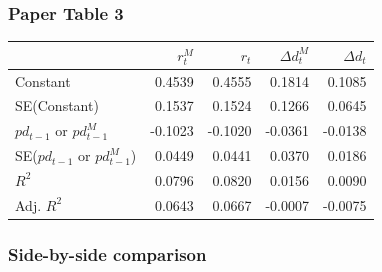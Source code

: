 \documentclass[11pt]{article}
\begin{document}
\subsubsection{Paper Table 3}\label{paper-table-3}

{\def\LTcaptype{none} %
\begin{longtable}[]{@{}lrrrr@{}}
\toprule\noalign{}
& \(r_t^M\) & \(r_t\) & \(\Delta d_t^M\) & \(\Delta d_t\) \\
\midrule\noalign{}
\endhead
\bottomrule\noalign{}
\endlastfoot
Constant & 0.4539 & 0.4555 & 0.1814 & 0.1085 \\
SE(Constant) & 0.1537 & 0.1524 & 0.1266 & 0.0645 \\
\(pd_{t-1}\) or \(pd_{t-1}^M\) & -0.1023 & -0.1020 & -0.0361 &
-0.0138 \\
SE(\(pd_{t-1}\) or \(pd_{t-1}^M\)) & 0.0449 & 0.0441 & 0.0370 &
0.0186 \\
\(R^2\) & 0.0796 & 0.0820 & 0.0156 & 0.0090 \\
Adj. \(R^2\) & 0.0643 & 0.0667 & -0.0007 & -0.0075 \\
\end{longtable}
}

\subsubsection{Side-by-side comparison}\label{side-by-side-comparison}
\end{document}
